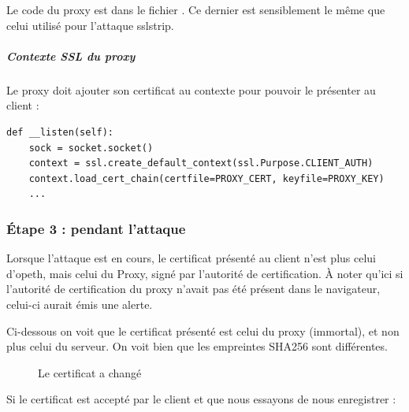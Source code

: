 Le code du proxy est dans le fichier . Ce dernier est sensiblement le même que celui utilisé pour l'attaque sslstrip.

\subparagraph{Contexte SSL du proxy \\}

Le proxy doit ajouter son certificat au contexte pour pouvoir le présenter au client :

\begin{verbatim}
def __listen(self):
	sock = socket.socket()
	context = ssl.create_default_context(ssl.Purpose.CLIENT_AUTH)
	context.load_cert_chain(certfile=PROXY_CERT, keyfile=PROXY_KEY)
	...
\end{verbatim}

\subsubsection{Étape 3 : pendant l'attaque}

Lorsque l'attaque est en cours, le certificat présenté au client n'est plus celui d'opeth, mais celui du Proxy, signé par l'autorité de certification. À noter qu'ici si l'autorité de certification du proxy n'avait pas été présent dans le navigateur, celui-ci aurait émis une alerte.

Ci-dessous on voit que le certificat présenté est celui du proxy (immortal), et non plus celui du serveur. On voit bien que les empreintes SHA256 sont différentes.

\begin{figure}[H]
  \caption{Le certificat a changé}
\end{figure}

Si le certificat est accepté par le client et que nous essayons de nous enregistrer :

